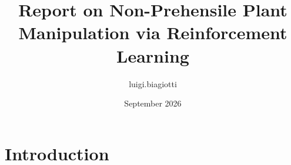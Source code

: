 \documentclass{article}
\title{Report on Non-Prehensile Plant Manipulation via Reinforcement Learning}
\author{luigi.biagiotti }
\date{September 2026}
\begin{document}
\maketitle

\section{Introduction}




\end{document}
